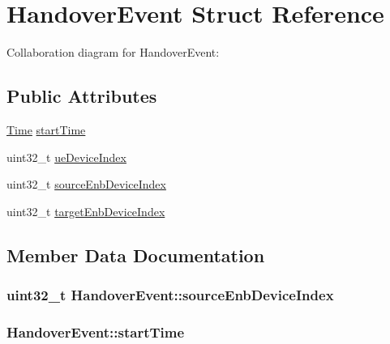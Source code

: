 \hypertarget{structHandoverEvent}{}\section{Handover\+Event Struct Reference}
\label{structHandoverEvent}


Collaboration diagram for Handover\+Event\+:
\subsection*{Public Attributes}
\begin{DoxyCompactItemize}
\item 
\hyperlink{classns3_1_1Time}{Time} \hyperlink{structHandoverEvent_a0cf5dcaff09d2d881047c40733d3005f}{start\+Time}
\item 
uint32\+\_\+t \hyperlink{structHandoverEvent_a0a353020e6276c4e900aa767354e3963}{ue\+Device\+Index}
\item 
uint32\+\_\+t \hyperlink{structHandoverEvent_a8b235fe78d5b2d534b1e32b7d4d2b0f4}{source\+Enb\+Device\+Index}
\item 
uint32\+\_\+t \hyperlink{structHandoverEvent_a2c869bb0b63b95b0285d3dfca98f81e7}{target\+Enb\+Device\+Index}
\end{DoxyCompactItemize}


\subsection{Member Data Documentation}
\subsubsection[{\texorpdfstring{source\+Enb\+Device\+Index}{sourceEnbDeviceIndex}}]{\setlength{\rightskip}{0pt plus 5cm}uint32\+\_\+t Handover\+Event\+::source\+Enb\+Device\+Index}\hypertarget{structHandoverEvent_a8b235fe78d5b2d534b1e32b7d4d2b0f4}{}\label{structHandoverEvent_a8b235fe78d5b2d534b1e32b7d4d2b0f4}
\subsubsection[{\texorpdfstring{start\+Time}{startTime}}]{ Handover\+Event\+::start\+Time}\hypertarget{structHandoverEvent_a0cf5dcaff09d2d881047c40733d3005f}{}\label{structHandoverEvent_a0cf5dcaff09d2d881047c40733d3005f}
